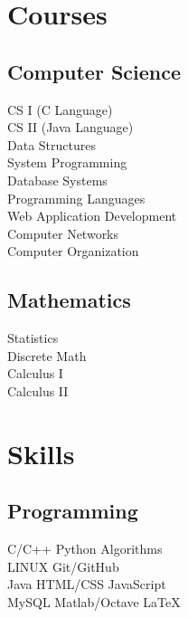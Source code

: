 \documentclass[]{deedy-resume-openfont}
\begin{document}
\begin{minipage}[t]{0.33\textwidth}

\section{Courses}
\subsection{Computer Science}
CS I (C Language) \\
CS II (Java Language) \\
Data Structures \\
System Programming \\
Database Systems \\
Programming Languages \\
Web Application Development \\
Computer Networks \\
Computer Organization \\
\sectionsep

\subsection{Mathematics}
Statistics \\
Discrete Math \\
Calculus I \\
Calculus II \\
\sectionsep


\section{Skills}
\subsection{Programming}
C/C++ \textbullet{} Python \textbullet{} Algorithms \\
LINUX \textbullet{} Git/GitHub \\
Java \textbullet{} HTML/CSS \textbullet{} JavaScript \\
MySQL \textbullet{} Matlab/Octave \textbullet{} \LaTeX \\
\sectionsep


%
%


\end{minipage} 
\end{document}
